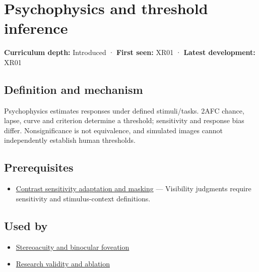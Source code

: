 \hypertarget{appendix-1759f03e8ce7}{}\label{referencestart:appendix-1759f03e8ce7}
\section{Psychophysics and threshold inference}\label{appendix-1759f03e8ce7-psychophysics-and-threshold-inference}

\textbf{Curriculum depth:} Introduced · \textbf{First seen:} XR01 · \textbf{Latest development:} XR01

\begin{allmightroledefinition}

\subsection{Definition and mechanism}\label{appendix-1759f03e8ce7-definition-and-mechanism}

Psychophysics estimates responses under defined stimuli/tasks. 2AFC chance, lapse, curve and criterion determine a threshold; sensitivity and response bias differ. Nonsignificance is not equivalence, and simulated images cannot independently establish human thresholds.

\end{allmightroledefinition}

\subsection{Prerequisites}\label{appendix-1759f03e8ce7-prerequisites}

\begin{itemize}
\tightlist
\item
  \hyperref[appendix-b3aa9e8e01ad]{Contrast sensitivity adaptation and masking} --- Visibility judgments require sensitivity and stimulus-context definitions.
\end{itemize}

\subsection{Used by}\label{appendix-1759f03e8ce7-used-by}

\begin{itemize}
\tightlist
\item
  \hyperref[appendix-8dc848f14052]{Stereoacuity and binocular foveation}
\item
  \hyperref[appendix-65788587ef78]{Research validity and ablation}
\end{itemize}


